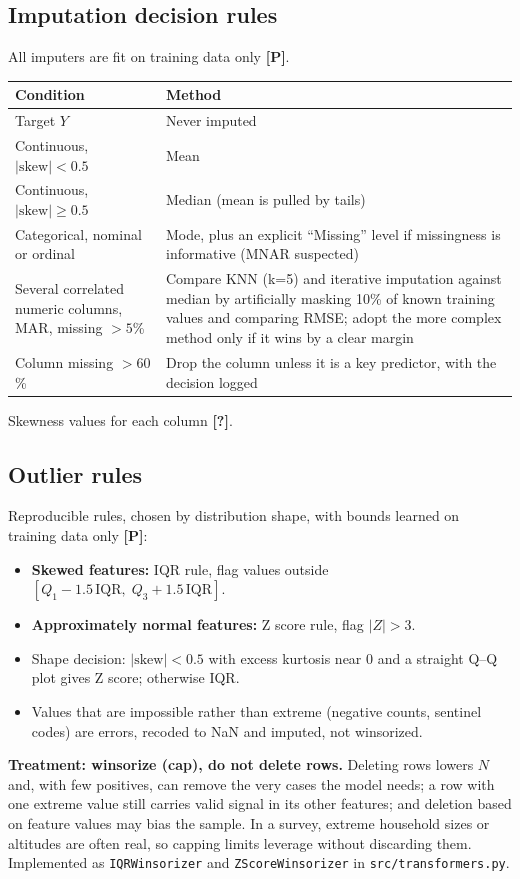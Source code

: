 \documentclass[11pt,a4paper]{article}
\newcommand{\Pl}{\textbf{[P]}}   %
\newcommand{\Q}{\textbf{[?]}}   %
\begin{document}
\subsection{Imputation decision rules}
All imputers are fit on training data only \Pl.
\begin{center}\small
\begin{tabular}{@{}p{4.6cm}p{9.7cm}@{}}\toprule
Condition & Method\\\midrule
Target $Y$ & Never imputed\\
Continuous, $|\text{skew}|<0.5$ & Mean\\
Continuous, $|\text{skew}|\ge0.5$ & Median (mean is pulled by tails)\\
Categorical, nominal or ordinal & Mode, plus an explicit ``Missing'' level if missingness is informative (MNAR suspected)\\
Several correlated numeric columns, MAR, missing $>5$\% & Compare KNN (k=5) and iterative imputation against median by artificially masking 10\% of known training values and comparing RMSE; adopt the more complex method only if it wins by a clear margin\\
Column missing $>60$\% & Drop the column unless it is a key predictor, with the decision logged\\\bottomrule
\end{tabular}\end{center}
Skewness values for each column \Q.

\subsection{Outlier rules}
Reproducible rules, chosen by distribution shape, with bounds learned on training data only \Pl:
\begin{itemize}
\item \textbf{Skewed features:} IQR rule, flag values outside $[Q_1-1.5\,\mathrm{IQR},\;Q_3+1.5\,\mathrm{IQR}]$.
\item \textbf{Approximately normal features:} Z score rule, flag $|Z|>3$.
\item Shape decision: $|\text{skew}|<0.5$ with excess kurtosis near 0 and a straight Q--Q plot gives Z score; otherwise IQR.
\item Values that are impossible rather than extreme (negative counts, sentinel codes) are errors, recoded to NaN and imputed, not winsorized.
\end{itemize}
\textbf{Treatment: winsorize (cap), do not delete rows.} Deleting rows lowers $N$ and, with few positives, can remove the very cases the model needs; a row with one extreme value still carries valid signal in its other features; and deletion based on feature values may bias the sample. In a survey, extreme household sizes or altitudes are often real, so capping limits leverage without discarding them. Implemented as \texttt{IQRWinsorizer} and \texttt{ZScoreWinsorizer} in \texttt{src/transformers.py}.
\end{document}
